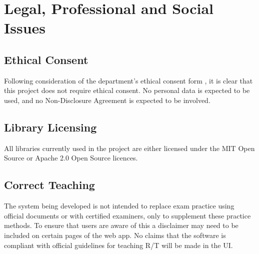 \section{Legal, Professional and Social Issues}
\subsection{Ethical Consent}
Following consideration of the department's ethical consent form \cite{ethical-consent}, it is clear that this project does not require ethical consent. No personal data is expected to be used, and no Non-Disclosure Agreement is expected to be involved.

\subsection{Library Licensing}
All libraries currently used in the project are either licensed under the MIT Open Source or Apache 2.0 Open Source licences.

\subsection{Correct Teaching}
The system being developed is not intended to replace exam practice using official documents or with certified examiners, only to supplement these practice methods. To ensure that users are aware of this a disclaimer may need to be included on certain pages of the web app. No claims that the software is compliant with official guidelines for teaching R/T will be made in the UI.